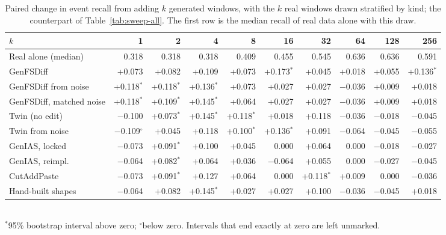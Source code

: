 \documentclass[11pt,a4paper]{article}
\begin{document}
\begin{table}[t]
\centering
\caption{Paired change in event recall from adding $k$ generated windows,
with the $k$ real windows drawn stratified by kind; the counterpart of
Table~\ref{tab:sweep-all}. The first row is the median recall of real data
alone with this draw.}
\label{tab:strat}
\footnotesize
\setlength{\tabcolsep}{3.4pt}
\begin{tabular}{@{}lrrrrrrrrr@{}}
\toprule
$k$ & 1 & 2 & 4 & 8 & 16 & 32 & 64 & 128 & 256 \\
\midrule
Real alone (median) & 0.318 & 0.318 & 0.318 & 0.409 & 0.455 & 0.545 & 0.636 & 0.636 & 0.591 \\
\midrule
GenFSDiff & +0.073 & +0.082 & +0.109 & +0.073 & +0.173$^{\ast}$ & +0.045 & +0.018 & +0.055 & +0.136$^{\ast}$ \\
GenFSDiff from noise & +0.118$^{\ast}$ & +0.118$^{\ast}$ & +0.136$^{\ast}$ & +0.073 & +0.027 & +0.027 & $-$0.036 & +0.009 & +0.018 \\
GenFSDiff, matched noise & +0.118$^{\ast}$ & +0.109$^{\ast}$ & +0.145$^{\ast}$ & +0.064 & +0.027 & +0.027 & $-$0.036 & +0.009 & +0.018 \\
Twin (no edit) & $-$0.100 & +0.073$^{\ast}$ & +0.145$^{\ast}$ & +0.118$^{\ast}$ & +0.018 & +0.118 & $-$0.036 & $-$0.018 & $-$0.045 \\
Twin from noise & $-$0.109$^{\circ}$ & +0.045 & +0.118 & +0.100$^{\ast}$ & +0.136$^{\ast}$ & +0.091 & $-$0.064 & $-$0.045 & $-$0.055 \\
\midrule
GenIAS, locked & $-$0.073 & +0.091$^{\ast}$ & +0.100 & +0.045 & 0.000 & +0.064 & 0.000 & $-$0.018 & $-$0.027 \\
GenIAS, reimpl. & $-$0.064 & +0.082$^{\ast}$ & +0.064 & +0.036 & $-$0.064 & +0.055 & 0.000 & $-$0.027 & $-$0.045 \\
CutAddPaste & $-$0.073 & +0.091$^{\ast}$ & +0.127 & +0.064 & 0.000 & +0.118$^{\ast}$ & +0.009 & 0.000 & $-$0.036 \\
Hand-built shapes & $-$0.064 & +0.082 & +0.145$^{\ast}$ & +0.027 & +0.027 & +0.100 & $-$0.036 & $-$0.045 & +0.018 \\
\bottomrule
\end{tabular}\\[0.3em]
{\footnotesize $^{\ast}$95\% bootstrap interval above zero; $^{\circ}$below
zero. Intervals that end exactly at zero are left unmarked.}
\end{table}
\end{document}
